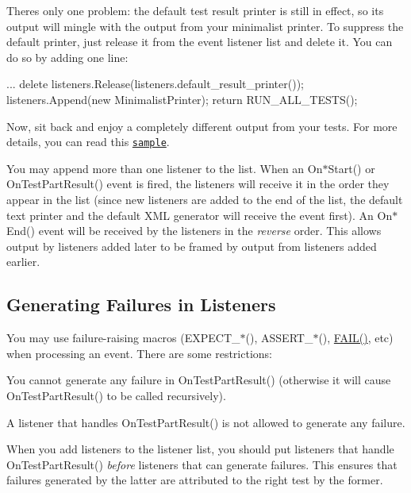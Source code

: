 There\textquotesingle{}s only one problem\+: the default test result printer is still in effect, so its output will mingle with the output from your minimalist printer. To suppress the default printer, just release it from the event listener list and delete it. You can do so by adding one line\+: 
\begin{DoxyCode}
...
delete listeners.Release(listeners.default\_result\_printer());
listeners.Append(new MinimalistPrinter);
return RUN\_ALL\_TESTS();
\end{DoxyCode}


Now, sit back and enjoy a completely different output from your tests. For more details, you can read this \href{../samples/sample9_unittest.cc}{\tt sample}.

You may append more than one listener to the list. When an {\ttfamily On$\ast$\+Start()} or {\ttfamily On\+Test\+Part\+Result()} event is fired, the listeners will receive it in the order they appear in the list (since new listeners are added to the end of the list, the default text printer and the default X\+ML generator will receive the event first). An {\ttfamily On$\ast$\+End()} event will be received by the listeners in the {\itshape reverse} order. This allows output by listeners added later to be framed by output from listeners added earlier.

\subsection*{Generating Failures in Listeners}

You may use failure-\/raising macros ({\ttfamily E\+X\+P\+E\+C\+T\+\_\+$\ast$()}, {\ttfamily A\+S\+S\+E\+R\+T\+\_\+$\ast$()}, {\ttfamily \hyperlink{gtest_8h_a3e26a8d27caa386ed0ea7ce9d5b7c4ed}{F\+A\+I\+L()}}, etc) when processing an event. There are some restrictions\+:


\begin{DoxyEnumerate}
\item You cannot generate any failure in {\ttfamily On\+Test\+Part\+Result()} (otherwise it will cause {\ttfamily On\+Test\+Part\+Result()} to be called recursively).
\end{DoxyEnumerate}
\begin{DoxyEnumerate}
\item A listener that handles {\ttfamily On\+Test\+Part\+Result()} is not allowed to generate any failure.
\end{DoxyEnumerate}

When you add listeners to the listener list, you should put listeners that handle {\ttfamily On\+Test\+Part\+Result()} {\itshape before} listeners that can generate failures. This ensures that failures generated by the latter are attributed to the right test by the former.

